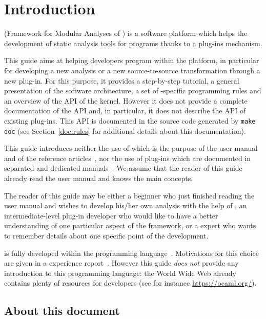 
\chapter{Introduction}

\framac (Framework for Modular Analyses of \C) is a software platform which
helps the development of static analysis tools for \C programs thanks to a
plug-ins mechanism. 

This guide aims at helping developers program within the \framac platform,
in particular for developing a new analysis or a new source-to-source
transformation through a new plug-in. For this purpose, it provides a
step-by-step tutorial, a general presentation of the \framac software
architecture, a set of \framac-specific programming rules and an overview of the
API of the \framac kernel. However it does not provide a complete documentation
of the \framac API and, in particular, it does not describe the API of 
existing \framac plug-ins. This API is documented in the \html source code
generated by \texttt{make doc} (see
Section~\ref{doc:rules} for additional details about this
documentation). 

This guide introduces neither the use of \framac which is the purpose of the
user manual~\cite{userman} and of the reference articles~\cite{sefm12,fac15},
nor the use of plug-ins which are documented in separated and dedicated
manuals~\cite{slicing,wp,value,rte,aorai}.  We assume that the reader of this
guide already read the \framac user manual and knows the main \framac concepts.

The reader of this guide may be either a \framac beginner who just finished 
reading the user manual and wishes to develop his/her own analysis with the help
of \framac, an intermediate-level plug-in developer who would like to have 
a better understanding of one particular aspect of the framework, 
or a \framac expert who wants to remember details about one specific point 
of the \framac development.

\framac is fully developed within the \ocaml programming
language~\cite{caml}. Motivations for this choice are given in a \framac
experience report~\cite{framac-experience}. However this guide \emph{does not}
provide any introduction to this programming language: the World Wide Web
already contains plenty of resources for \caml developers (see for instance
\url{https://ocaml.org/}).

\section{About this document}

